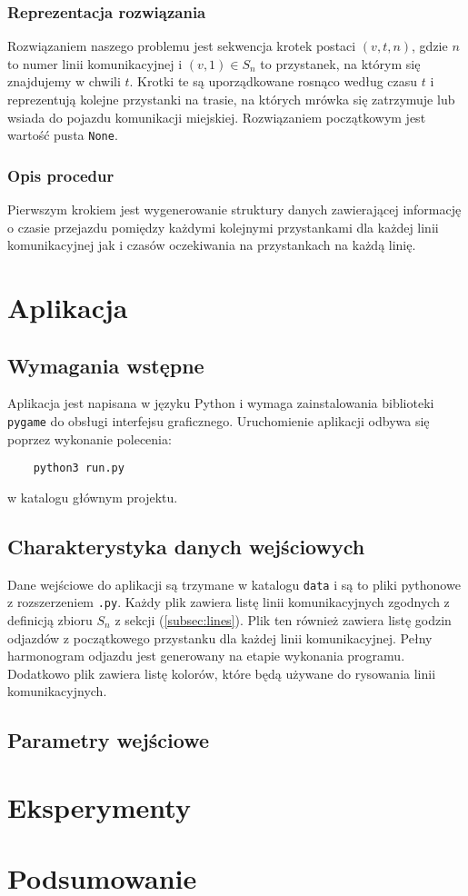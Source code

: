 \documentclass{article}
\begin{document}
\subsubsection{Reprezentacja rozwiązania}
Rozwiązaniem naszego problemu jest sekwencja krotek postaci \((v, t, n)\), gdzie \(n\) to numer linii komunikacyjnej i
\((v, 1)\in S_n\) to przystanek, na którym się znajdujemy w chwili \(t\). Krotki te są uporządkowane rosnąco według czasu \(t\) i reprezentują
kolejne przystanki na trasie, na których mrówka się zatrzymuje lub wsiada do pojazdu komunikacji miejskiej.
Rozwiązaniem początkowym jest wartość pusta \texttt{None}.

\subsubsection{Opis procedur}
Pierwszym krokiem jest wygenerowanie struktury danych zawierającej informację o czasie przejazdu pomiędzy każdymi
kolejnymi przystankami dla każdej linii komunikacyjnej jak i czasów oczekiwania na przystankach na każdą linię.

\section{Aplikacja}
\subsection{Wymagania wstępne}
Aplikacja jest napisana w języku Python i wymaga zainstalowania biblioteki \texttt{pygame} do obsługi interfejsu graficznego.
Uruchomienie aplikacji odbywa się poprzez wykonanie polecenia:
\begin{verbatim}
    python3 run.py
\end{verbatim}
w katalogu głównym projektu.

\subsection{Charakterystyka danych wejściowych}
Dane wejściowe do aplikacji są trzymane w katalogu \texttt{data} i są to pliki pythonowe z rozszerzeniem \texttt{.py}.
Każdy plik zawiera listę linii komunikacyjnych zgodnych z definicją zbioru \(S_n\) z sekcji (\ref{subsec:lines}). Plik ten
również zawiera listę godzin odjazdów z początkowego przystanku dla każdej linii komunikacyjnej. Pełny harmonogram odjazdu
jest generowany na etapie wykonania programu. Dodatkowo plik zawiera listę kolorów, które będą używane do rysowania linii komunikacyjnych.

\subsection{Parametry wejściowe}

\section{Eksperymenty}

\section{Podsumowanie}
\end{document}
